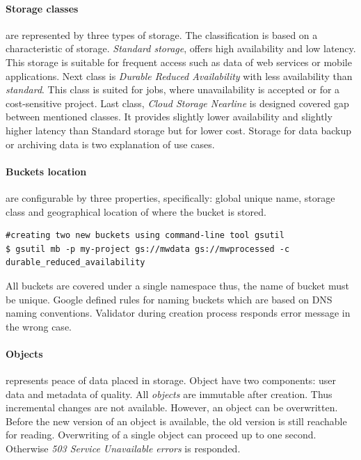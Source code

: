 \documentclass[a4paper,12pt,oneside]{report}
\begin{document}
\paragraph{Storage classes} are represented by three types of storage. The classification is based 
on a characteristic of storage. \textit{Standard storage}, offers high availability and low 
latency. This storage is suitable for frequent access such 
as data of web services or mobile applications.
Next class is \textit{Durable Reduced Availability} with less availability than  \textit{standard}. 
This class is suited for jobs, where unavailability is accepted or for a cost-sensitive project. 
Last class, \textit{Cloud Storage Nearline} is designed 
covered gap between mentioned classes. It provides slightly lower availability and slightly higher 
latency than Standard storage but for lower cost. 
Storage for data backup or archiving data is two explanation of use cases.

\paragraph{Buckets location} are configurable by three properties, specifically: global unique 
name, storage class and geographical location of where the bucket is stored.

\begin{footnotesize}
\begin{lstlisting}[style=mybash]
#creating two new buckets using command-line tool gsutil
$ gsutil mb -p my-project gs://mwdata gs://mwprocessed -c durable_reduced_availability
\end{lstlisting}
\end{footnotesize}
 

All buckets are covered under a single namespace thus, the name of bucket must be unique. 
Google defined rules for naming buckets which are based on DNS naming conventions. Validator 
during creation process responds error message in the wrong case. 

\paragraph{Objects} represents peace of data placed in storage. Object have two components: 
user data and metadata of quality. All \textit{objects} are immutable after creation. Thus 
incremental changes are not available. However, an object 
can be overwritten. Before the new version of an object is available, the old version is still 
reachable for reading. Overwriting of a single object 
can proceed up to one second. Otherwise \textit{503 Service Unavailable errors} is responded.
\end{document}
